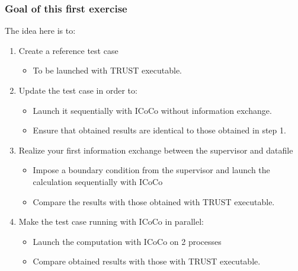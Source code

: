 \documentclass[10pt, hyperref={unicode=true,pdfusetitle, bookmarks=true,bookmarksnumbered=false,bookmarksopen=false, breaklinks=false,pdfborder={0 0 1},backref=true,colorlinks=true,linkcolor=darkblue,pageanchor, urlcolor=darkblue}]{beamer}
\begin{document}
\begin{frame}
\frametitle{Goal of this first exercise}
\begin{block}{}
The idea here is to:

\begin{enumerate}
\item  Create a reference test case 
\begin{itemize}
\item To be launched with TRUST executable.
\end{itemize}\vspace{0.1cm}
\item Update the test case in order to:
\begin{itemize}
\item Launch it sequentially with ICoCo without information exchange.
\item  Ensure that obtained results are identical to those obtained in step 1.
\end{itemize}\vspace{0.1cm}
\item Realize your first information exchange between the supervisor and datafile
\begin{itemize}
\item Impose a boundary condition from the supervisor and launch the calculation sequentially with ICoCo
\item Compare the results with those obtained with TRUST executable.
\end{itemize}\vspace{0.1cm}
\item Make the test case running with ICoCo in parallel:
\begin{itemize}
\item Launch the computation with ICoCo on 2 processes \item Compare obtained results with those with TRUST executable.
\end{itemize}
\end{enumerate}

\end{block}
\end{frame}
\end{document}
